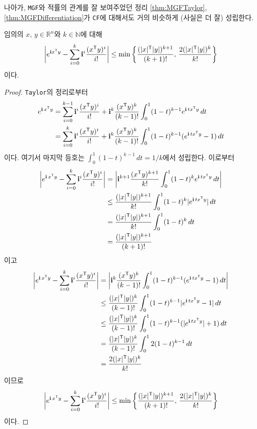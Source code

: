 나아가, \texttt{MGF}와 적률의 관계를 잘 보여주었던 정리 \ref{thm:MGFTaylor}, \ref{thm:MGFDifferentiation}가 \texttt{CF}에 대해서도 거의 비슷하게 (사실은 더 잘) 성립한다.

\begin{lemma}\label{lem:expComplex}
    임의의 $x,\,y\in\mathbb{R}^n$와 $k\in\mathbb{N}$에 대해
    \begin{equation*}
        \bigg|e^{\mathbf{i} x^{\mathsf{T}} y}-\sum_{i=0}^k\mathbf{i}^i\frac{(x^{\mathsf{T}} y)^i}{i!}\bigg|\leq\min\bigg\{\frac{(|x|^{\mathsf{T}}|y|)^{k+1}}{(k+1)!},\,\frac{2(|x|^{\mathsf{T}}|y|)^k}{k!}\bigg\}
    \end{equation*}
    이다.
\end{lemma}

\begin{proof}
    \texttt{Taylor}의 정리로부터
    \begin{align*}
        e^{\mathbf{i}\,x^{\mathsf{T}} y}&=\sum_{i=0}^{k-1}\mathbf{i}^i\frac{(x^{\mathsf{T}} y)^i}{i!}+\mathbf{i}^k\frac{(x^{\mathsf{T}} y)^k}{(k-1)!}\int_0^1(1-t)^{k-1}e^{\mathbf{i}\,tx^{\mathsf{T}} y}\,dt\\
        &=\sum_{i=0}^k\mathbf{i}^i\frac{(x^{\mathsf{T}} y)^i}{i!}+\mathbf{i}^k\frac{(x^{\mathsf{T}} y)^k}{(k-1)!}\int_0^1(1-t)^{k-1}(e^{\mathbf{i}\,tx^{\mathsf{T}} y}-1)\,dt
    \end{align*}
    이다. 여기서 마지막 등호는 $\int_0^1(1-t)^{k-1}\,dt=1/k$에서 성립한다. 이로부터
    \begin{align*}
        \bigg|e^{\mathbf{i}\,x^{\mathsf{T}} y}-\sum_{i=0}^k\mathbf{i}^i\frac{(x^{\mathsf{T}} y)^i}{i!}\bigg|&=\bigg|\mathbf{i}^{k+1}\frac{(x^{\mathsf{T}} y)^{k+1}}{k!}\int_0^1(1-t)^ke^{\mathbf{i}\,tx^{\mathsf{T}} y}\,dt\bigg|\\
        &\leq\frac{(|x|^{\mathsf{T}}|y|)^{k+1}}{k!}\int_0^1(1-t)^k|e^{\mathbf{i}\,tx^{\mathsf{T}} y}|\,dt\\
        &=\frac{(|x|^{\mathsf{T}}|y|)^{k+1}}{k!}\int_0^1(1-t)^k\,dt\\
        &=\frac{(|x|^{\mathsf{T}}|y|)^{k+1}}{(k+1)!}
    \end{align*}
    이고
    \begin{align*}
        \bigg|e^{\mathbf{i}\,x^{\mathsf{T}} y}-\sum_{i=0}^k\mathbf{i}^i\frac{(x^{\mathsf{T}} y)^i}{i!}\bigg|&=\bigg|\mathbf{i}^k\frac{(x^{\mathsf{T}} y)^k}{(k-1)!}\int_0^1(1-t)^{k-1}(e^{\mathbf{i}\,tx^{\mathsf{T}} y}-1)\,dt\bigg|\\
        &\leq\frac{(|x|^{\mathsf{T}}|y|)^k}{(k-1)!}\int_0^1(1-t)^{k-1}|e^{\mathbf{i}\,tx^{\mathsf{T}} y}-1|\,dt\\
        &\leq\frac{(|x|^{\mathsf{T}}|y|)^k}{(k-1)!}\int_0^1(1-t)^{k-1}(|e^{\mathbf{i}\,tx^{\mathsf{T}} y}|+1)\,dt\\
        &=\frac{(|x|^{\mathsf{T}}|y|)^k}{(k-1)!}\int_0^12(1-t)^{k-1}\,dt\\
        &=\frac{2(|x|^{\mathsf{T}}|y|)^k}{k!}
    \end{align*}
    이므로
    \begin{equation*}
        \bigg|e^{\mathbf{i}\,x^{\mathsf{T}} y}-\sum_{i=0}^k\mathbf{i}^i\frac{(x^{\mathsf{T}} y)^i}{i!}\bigg|\leq\min\bigg\{\frac{(|x|^{\mathsf{T}}|y|)^{k+1}}{(k+1)!},\,\frac{2(|x|^{\mathsf{T}}|y|)^k}{k!}\bigg\}
    \end{equation*}
    이다.
\end{proof}

